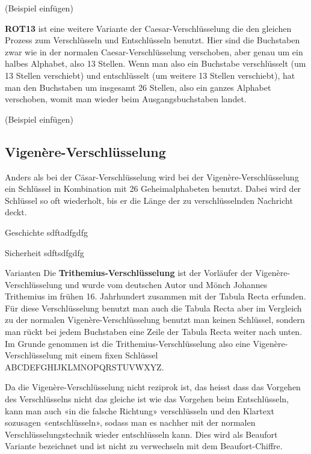 (Beispiel einfügen)

\textbf{ROT13} ist eine weitere Variante der Caesar-Verschlüsselung die den gleichen Prozess zum Verschlüsseln und Entschlüsseln benutzt. Hier sind die Buchstaben zwar wie in der normalen Caesar-Verschlüsselung verschoben, aber genau um ein halbes Alphabet, also 13 Stellen. Wenn man also ein Buchstabe verschlüsselt (um 13 Stellen verschiebt) und entschlüsselt (um weitere 13 Stellen verschiebt), hat man den Buchstaben um insgesamt 26 Stellen, also ein ganzes Alphabet verschoben, womit man wieder beim Ausgangsbuchstaben landet.

(Beispiel einfügen)

\newpage %
\subsection{Vigenère-Verschlüsselung}
Anders als bei der Cäsar-Verschlüsselung wird bei der Vigenère-Verschlüsselung ein Schlüssel in Kombination mit 26 Geheimalphabeten benutzt. Dabei wird der Schlüssel so oft wiederholt, bis er die Länge der zu verschlüsselnden Nachricht deckt.

Geschichte
sdftadfgdfg

Sicherheit
sdftsdfgdfg

Varianten
Die \textbf{Trithemius-Verschlüsselung} ist der Vorläufer der Vigenère-Verschlüsselung und wurde vom deutschen Autor und Mönch Johannes Trithemius im frühen 16. Jahrhundert zusammen mit der Tabula Recta erfunden. Für diese Verschlüsselung benutzt man auch die Tabula Recta aber im Vergleich zu der normalen Vigenère-Verschlüsselung benutzt man keinen Schlüssel, sondern man rückt bei jedem Buchstaben eine Zeile der Tabula Recta weiter nach unten. Im Grunde genommen ist die Trithemius-Verschlüsselung also eine Vigenère-Verschlüsselung mit einem fixen Schlüssel ABCDEFGHIJKLMNOPQRSTUVWXYZ.

Da die Vigenère-Verschlüsselung nicht reziprok ist, das heisst dass das Vorgehen des Verschlüsselns nicht das gleiche ist wie das Vorgehen beim Entschlüsseln, kann man auch «in die falsche Richtung» verschlüsseln und den Klartext sozusagen «entschlüsseln», sodass man es nachher mit der normalen Verschlüsselungstechnik wieder entschlüsseln kann. Dies wird als Beaufort Variante bezeichnet und ist nicht zu verwechseln mit dem Beaufort-Chiffre.



